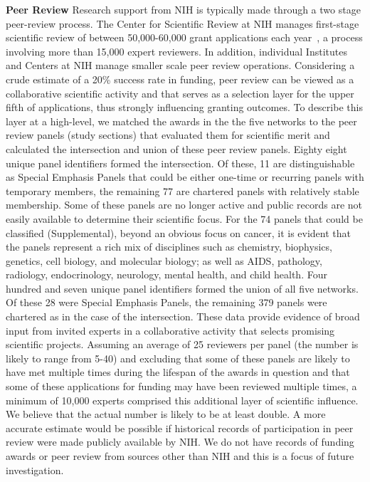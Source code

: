 \documentclass[10pt,letterpaper]{article}
\begin{document}
\textbf{Peer Review} Research support from NIH is typically made through a two stage peer-review process.  The Center for Scientific Review at NIH manages first-stage scientific review of between 50,000-60,000 grant applications each year~\cite{bibBoyack}, a process involving more than 15,000 expert reviewers. In addition, individual Institutes and Centers at NIH manage smaller scale peer review operations. Considering a crude estimate of a 20\% success rate in funding, peer review can be viewed as a collaborative scientific activity and that serves as a selection layer for the upper fifth of applications, thus strongly influencing granting outcomes. To describe this layer at a high-level, we matched the awards in the the five networks to the peer review panels (study sections) that evaluated them for scientific merit and calculated the intersection and union of these peer review panels. Eighty eight unique panel identifiers formed the intersection. Of these, 11 are distinguishable as Special Emphasis Panels that could be either one-time or recurring panels with temporary members, the remaining 77 are chartered panels with relatively stable membership. Some of these panels are no longer active and public records are not easily available to determine their scientific focus. For the 74 panels that could be classified (Supplemental), beyond an obvious focus on cancer, it is evident that the panels represent a rich mix of disciplines such as chemistry, biophysics, genetics, cell biology, and molecular biology; as well as AIDS, pathology, radiology, endocrinology, neurology, mental health, and child health. Four hundred and seven unique panel identifiers formed the union of all five networks. Of these 28 were Special Emphasis Panels, the remaining 379 panels were chartered as in the case of the intersection. These data provide evidence of broad input from invited experts in a collaborative activity that selects promising scientific projects. Assuming an average of 25 reviewers per panel (the number is likely to range from 5-40) and excluding that some of these panels are likely to have met multiple times during the lifespan of the awards in question and that some of these applications for funding may have been reviewed multiple times, a minimum of 10,000 experts comprised this additional layer of scientific influence. We believe that the actual number is likely to be at least double. A more accurate estimate would be possible if historical records of participation in peer review were made publicly available by NIH. We do not have records of funding awards or peer review from sources other than NIH and this is a focus of future investigation.
\end{document}
